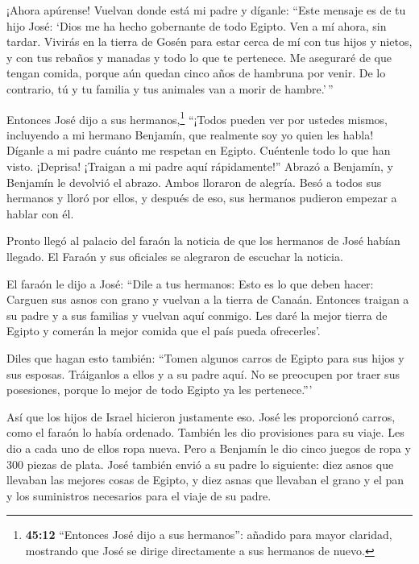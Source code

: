  ¡Ahora apúrense! Vuelvan donde está mi padre y díganle:
``Este mensaje es de tu hijo José: `Dios me ha hecho gobernante de todo
Egipto. Ven a mí ahora, sin tardar.  Vivirás en la tierra
de Gosén para estar cerca de mí con tus hijos y nietos, y con tus
rebaños y manadas y todo lo que te pertenece.  Me aseguraré
de que tengan comida, porque aún quedan cinco años de hambruna por
venir. De lo contrario, tú y tu familia y tus animales van a morir de
hambre.'\,''

 Entonces José dijo a sus hermanos,\footnote{\textbf{45:12}
  ``Entonces José dijo a sus hermanos'': añadido para mayor claridad,
  mostrando que José se dirige directamente a sus hermanos de nuevo.}
``¡Todos pueden ver por ustedes mismos, incluyendo a mi hermano
Benjamín, que realmente soy yo quien les habla!  Díganle a
mi padre cuánto me respetan en Egipto. Cuéntenle todo lo que han visto.
¡Deprisa! ¡Traigan a mi padre aquí rápidamente!''  Abrazó a
Benjamín, y Benjamín le devolvió el abrazo. Ambos lloraron de alegría.
 Besó a todos sus hermanos y lloró por ellos, y después de
eso, sus hermanos pudieron empezar a hablar con él.

 Pronto llegó al palacio del faraón la noticia de que los
hermanos de José habían llegado. El Faraón y sus oficiales se alegraron
de escuchar la noticia.

 El faraón le dijo a José: ``Dile a tus hermanos: Esto es
lo que deben hacer: Carguen sus asnos con grano y vuelvan a la tierra de
Canaán.  Entonces traigan a su padre y a sus familias y
vuelvan aquí conmigo. Les daré la mejor tierra de Egipto y comerán la
mejor comida que el país pueda ofrecerles'.

 Diles que hagan esto también: ``Tomen algunos carros de
Egipto para sus hijos y sus esposas. Tráiganlos a ellos y a su padre
aquí.  No se preocupen por traer sus posesiones, porque lo
mejor de todo Egipto ya les pertenece.'''

 Así que los hijos de Israel hicieron justamente eso. José
les proporcionó carros, como el faraón lo había ordenado. También les
dio provisiones para su viaje.  Les dio a cada uno de ellos
ropa nueva. Pero a Benjamín le dio cinco juegos de ropa y 300 piezas de
plata.  José también envió a su padre lo siguiente: diez
asnos que llevaban las mejores cosas de Egipto, y diez asnas que
llevaban el grano y el pan y los suministros necesarios para el viaje de
su padre.

